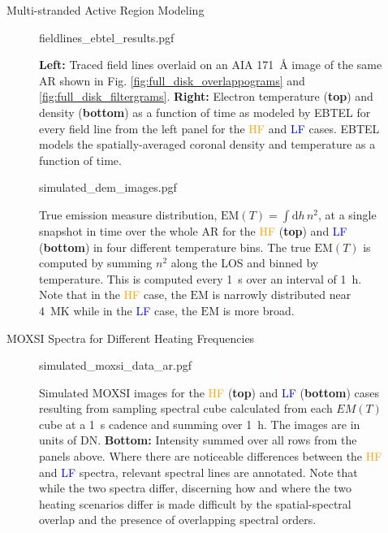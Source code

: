 \documentclass[final]{beamer}
\newlength{\colwidth}
\begin{document}
\begin{frame}[t]
\begin{columns}[t]
\begin{column}{\colwidth}
\begin{block}{Multi-stranded Active Region Modeling}
    \begin{figure}
      \centering
      {fieldlines_ebtel_results.pgf}
      \caption{\textbf{Left:} Traced field lines overlaid on an AIA \SI{171}{\angstrom} image of the same AR shown in Fig. \ref{fig:full_disk_overlappograms} and \ref{fig:full_disk_filtergrams}. \textbf{Right:} Electron temperature (\textbf{top}) and density (\textbf{bottom}) as a function of time as modeled by EBTEL for every field line from the left panel for the \textcolor{orange}{HF} and \textcolor{blue}{LF} cases. EBTEL models the spatially-averaged coronal density and temperature as a function of time.}
      \label{fig:fieldlines_ebtel_results}
    \end{figure}
    \vspace{-30px}
    \begin{figure}
      \centering
      {simulated_dem_images.pgf}
      \caption{True emission measure distribution, $\mathrm{EM}(T)=\int\mathrm{d}h\,n^2$, at a single snapshot in time over the whole AR for the \textcolor{orange}{HF} (\textbf{top}) and \textcolor{blue}{LF} (\textbf{bottom}) in four different temperature bins. The true $\mathrm{EM}(T)$ is computed by summing $n^2$ along the LOS and binned by temperature. This is computed every \SI{1}{\second} over an interval of \SI{1}{\hour}. Note that in the \textcolor{orange}{HF} case, the $\mathrm{EM}$ is narrowly distributed near \SI{4}{\mega\kelvin} while in the \textcolor{blue}{LF} case, the $\mathrm{EM}$ is more broad.}
      \label{fig:simulated_dem}
    \end{figure}

  \end{block}

  \vspace{-30px}

  \begin{block}{MOXSI Spectra for Different Heating Frequencies}

    \begin{figure}
      \centering
      {simulated_moxsi_data_ar.pgf}
      \caption{Simulated MOXSI images for the \textcolor{orange}{HF} (\textbf{top}) and \textcolor{blue}{LF} (\textbf{bottom}) cases resulting from sampling spectral cube calculated from each $EM(T)$ cube at a \SI{1}{\second} cadence and summing over \SI{1}{\hour}. The images are in units of DN. \textbf{Bottom:} Intensity summed over all rows from the panels above. Where there are noticeable differences between the \textcolor{orange}{HF} and \textcolor{blue}{LF} spectra, relevant spectral lines are annotated. Note that while the two spectra differ, \alert{discerning how and where the two heating scenarios differ is made difficult by the spatial-spectral overlap and the presence of overlapping spectral orders.}}
      \label{fig:simulated_moxsi_spectra}
    \end{figure}


\end{block}
\end{column}
\end{columns}
\end{frame}
\end{document}
